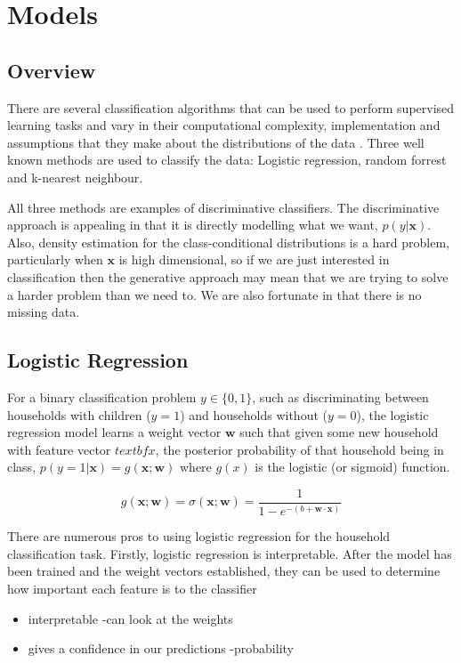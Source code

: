 
\chapter{Models}

\section{Overview}
There are several classification algorithms that can be used to perform supervised learning tasks and vary in their computational complexity, implementation and assumptions that they make about the distributions of the data \cite{Beckel3}. Three well known methods are used to classify the data: Logistic regression, random forrest and k-nearest neighbour.

All three methods are examples of discriminative classifiers. The discriminative approach is appealing in that it is directly modelling what we want, $p(y|\textbf{x})$. Also, density estimation for the class-conditional distributions is a hard problem, particularly when $\textbf{x}$ is high dimensional, so if we are just interested in classification then the generative approach may mean that we are trying to solve a harder problem than we need to\cite{Williams}. We are also fortunate in that there is no missing data. 

\section{Logistic Regression}
For a binary classification problem $y\in \{0,1\}$, such as discriminating between households with children ($y=1$) and households without ($y=0$), the logistic regression model learns a weight vector $\textbf{w}$ such that given some new household with feature vector $textbf{x}$, the posterior probability of that household being in class, $p(y=1|\textbf{x})=g(\textbf{x}; \textbf{w})$ where $g(x)$ is the logistic (or sigmoid) function.

\[g(\textbf{x}; \textbf{w})=\sigma(\textbf{x};\textbf{w})=\frac{1}{1-e^{-(b+\textbf{w}\cdot{\textbf{x}})}}\]

There are numerous pros to using logistic regression for the household classification task. Firstly, logistic regression is interpretable. After the model has been trained and the weight vectors established, they can be used to determine how important each feature is to the classifier


\begin{itemize}
\item interpretable -can look at the weights
\item gives a confidence in our predictions -probability
\end{itemize}

